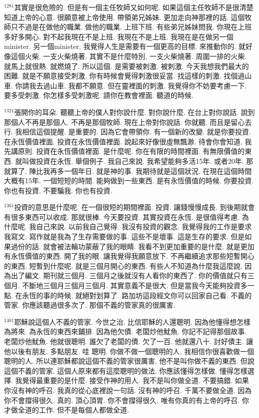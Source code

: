 \documentclass{book}
\begin{document}
$^{1281}$其實是很危險的.
但是有一個主任牧師又如何呢.
如果這個主任牧師不是很清楚知道上帝的心意.
很願意被上帝使用.
帶領弟兄姊妹.
更加走向神那裡的話.
這個牧師只不過是在做他的職業.
做他的職業.
上班下班.
有些弟兄姊妹問我.
你現在上班多好多開心.
對不起我現在不是上班.
我現在不是上班.
我現在是在做另一個minister.
另一個minister.
我覺得人生是需要有一個更高的目標.
來推動你的.
就好像這個火柴.
一支火柴燒著.
其實不是什麼特別.
一支火柴燒著.
周圍一排的火柴.
就馬上就很熱.
就燃燒了.
所以這個.
是需要被刺激.
被刺激.
今天我想我們最大的困難.
就是不願意接受刺激.
你有時候會覺得刺激很妥當.
找這樣的刺激.
找個過山車.
你請我去過山車.
我都不願意.
但在靈裡面的刺激.
我覺得你不妨要考慮一下.
要多受刺激.
你怎樣多受刺激呢.
請你在教會裡面.
聽道的時候.

$^{1321}$張開你的耳朵.
聽聽上帝的僕人對你說什麼.
對你說什麼.
在台上對你說話.
說到那個人不再是那個人.
不再是那個牧師.
現在上帝對你說話.
你就聽.
而且是留心去行.
我相信這個提醒.
是重要的.
因為它會帶領你.
有一個新的改變.
就是你要投資.
在永恆價值裡面.
投資在永恆價值裡面.
說起來好像很虛無飄渺.
待會你會知道.
我先講原則.
投資在永恆價值裡面.
是什麼呢.
你在有限的時間裡面.
有無限價值的東西.
就叫做投資在永恆.
舉個例子.
我自己來說.
我希望能夠多活15年.
或者20年.
那就算了.
陳比我再多一個年日.
就是神的事.
我期待就是這個狀況.
在現在這個時間大概有15年.
一個短短的時間.
能夠做到一些東西.
是有永恆價值的時候.
你要投資.
你也有投資.
不要騙我.
你也有投資.

$^{1361}$投資的意思是什麼呢.
在一個很短的期間裡面.
投資.
讓錢慢慢成長.
到後期就會有很多東西可以收成.
那就很棒.
今天要投資.
其實投資在永恆.
是很值得考慮.
為什麼呢.
我自己來說.
以前我自己覺得.
我沒有投資的觀念.
我覺得我的工作是要求我寫文.
寫作就是我為了生存需要做的事.
這些不是壞事.
這是生存的要求.
但是如果過份的話.
就會被法輪功蒙蔽了我的眼睛.
我看不到更加重要的是什麼.
就是更加有永恆價值的東西.
開了我的眼.
讓我覺得我願意放下.
不再繼續追求那些短暫開心的東西.
短暫到什麼呢.
就是三個月開心的東西.
有些人不知道為什麼我這麼說.
因為出了編文.
期刊就三個月.
三個月之後就沒有人看你的東西了.
你的價值就只有三個月.
不斷地三個月三個月三個月.
其實意義不是很大.
但是當我今天能夠投資多一點.
在永恆的事的時候.
就絕對划算了.
路加坊這段經文你可以回家自己看.
不義的管家.
你應該聽過很多次了.
那個不義的管家真的很厲害.

$^{1401}$耶穌說這個人不義的管家.
今世之治.
比信耶穌的人還聰明.
因為他懂得想怎樣為將來.
為永恆的東西來鋪排.
因為他欠債.
老闆炒他魷魚.
你記不記得那個故事.
老闆炒他魷魚.
他就很聰明.
誰欠了老闆的債.
欠了一百.
他就還八十.
討好債主.
讓他以後有朋友.
多點朋友.
哇 聰明.
你做不做一個聰明的人.
我相信你很喜歡做一個聰明的人.
所以連耶穌都說這個不義的管家很厲害.
他不是叫你做不義的東西.
但說這個不義的管家.
這個人原來都有這麼聰明的做法.
你應該懂得怎樣做.
懂得怎樣選擇.
我覺得最重要的是什麼.
接受作神的用人.
我不是叫你做全道.
不要搞錯.
如果你沒有神的呼召.
我真的從心底裡說一句話.
沒有神的呼召.
千萬不要做全道.
因為你不會撐得很久.
真的.
頂心頂胃.
你不會撐得很久.
唯有你真的有上帝的呼召.
你才做全道的工作.
但不是每個人都做全道.
\end{document}
